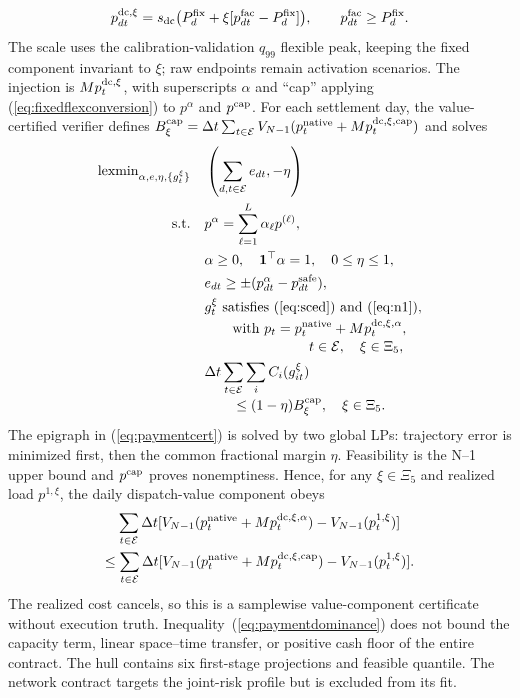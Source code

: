\documentclass[10pt,journal]{IEEEtran}
\newcommand{\PaymentSafe}{value-certified verifier}
\newcommand{\dt}{\Delta t}
\begin{document}
\begin{equation}
 p^{\rm dc,\xi}_{dt}=s_{\rm dc}\bigl(P^{\rm fix}_d+\xi[p^{\rm fac}_{dt}-P^{\rm fix}_d]\bigr),
 \qquad p^{\rm fac}_{dt}\geq P^{\rm fix}_d .
 \label{eq:fixedflexconversion}
\end{equation}
The scale uses the calibration-validation $q_{99}$ flexible peak, keeping the
fixed component invariant to $\xi$; raw endpoints remain activation scenarios.
The injection is $M p^{\rm dc,\xi}_t$, with superscripts $\alpha$ and ``cap''
applying (\ref{eq:fixedflexconversion}) to $p^\alpha$ and $p^{\rm cap}$. For
each settlement day, the \PaymentSafe{} defines
$B_\xi^{\rm cap}=\dt\sum_{t\in\mathcal E}
V_{N-1}(p_t^{\rm native}+M p_t^{\rm dc,\xi,cap})$ and solves
\begin{align}
\operatorname{lexmin}_{\alpha,e,\eta,\{g_t^\xi\}}\quad&
 \left(\sum_{d,t\in\mathcal E}e_{dt},-\eta\right)
 \label{eq:paymentcert}\\
\mathrm{s.t.}\quad&
 p^\alpha=\sum_{\ell=1}^{L}\alpha_\ell p^{(\ell)},\nonumber\\
&\alpha\geq0,\quad\mathbf1^\top\alpha=1,\quad 0\leq\eta\leq1,\nonumber\\
&e_{dt}\geq\pm(p^\alpha_{dt}-p^{\rm safe}_{dt}),\nonumber\\
&g_t^\xi\ \text{satisfies (\ref{eq:sced}) and (\ref{eq:n1})},\nonumber\\[-2pt]
&\hspace{2em}\text{with }p_t=p_t^{\rm native}+M p_t^{\rm dc,\xi,\alpha},\nonumber\\[-2pt]
&\hspace{7.5em}t\in\mathcal E,\quad \xi\in\Xi_5,\nonumber\\
&\dt\sum_{t\in\mathcal E}\sum_iC_i(g_{it}^\xi)\nonumber\\[-2pt]
&\hspace{2em}\leq(1-\eta)B_\xi^{\rm cap},
\quad \xi\in\Xi_5.\nonumber
\end{align}
The epigraph in (\ref{eq:paymentcert}) is solved by two global LPs: trajectory error is
minimized first, then the common fractional margin $\eta$. Feasibility is the
N--1 upper bound and $p^{\rm cap}$ proves nonemptiness. Hence, for any
$\xi\in\Xi_5$ and realized load $p^{1,\xi}$, the daily dispatch-value
component obeys
\begin{multline}
\sum_{t\in\mathcal E}\dt
[V_{N-1}(p_t^{\rm native}+M p_t^{\rm dc,\xi,\alpha})
-V_{N-1}(p^{1,\xi}_t)]\\
\leq\sum_{t\in\mathcal E}\dt
[V_{N-1}(p_t^{\rm native}+M p_t^{\rm dc,\xi,cap})
-V_{N-1}(p^{1,\xi}_t)].
\label{eq:paymentdominance}
\end{multline}
The realized cost cancels, so this is a samplewise value-component certificate
without execution truth. Inequality~(\ref{eq:paymentdominance}) does not bound the capacity term, linear
space--time transfer, or positive cash floor of the entire contract. The hull contains six first-stage projections and feasible quantile. The
network contract targets the joint-risk profile but is excluded from its fit.
\end{document}
